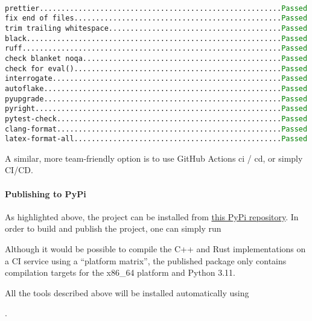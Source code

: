\texttt{
  \hspace*{-1em} prettier........................................................\textcolor{green}{Passed} \\
  fix end of files................................................\textcolor{green}{Passed} \\
  trim trailing whitespace........................................\textcolor{green}{Passed} \\
  black...........................................................\textcolor{green}{Passed} \\
  ruff............................................................\textcolor{green}{Passed} \\
  check blanket noqa..............................................\textcolor{green}{Passed} \\
  check for eval()................................................\textcolor{green}{Passed} \\
  interrogate.....................................................\textcolor{green}{Passed} \\
  autoflake.......................................................\textcolor{green}{Passed} \\
  pyupgrade.......................................................\textcolor{green}{Passed} \\
  pyright.........................................................\textcolor{green}{Passed} \\
  pytest-check....................................................\textcolor{green}{Passed} \\
  clang-format....................................................\textcolor{green}{Passed} \\
  latex-format-all................................................\textcolor{green}{Passed}
}

A similar, more team-friendly option is to use GitHub Actions \gls{ci} / \gls{cd}, or simply CI/CD.

\paragraph{Publishing to PyPi}
As highlighted above, the project can be installed from \href{https://pypi.org/project/melon-scheduler/}{this PyPi repository}.
In order to build and publish the project, one can simply run


Although it would be possible to compile the C++ and Rust implementations on a CI service using a ``platform matrix'', the published package only contains compilation targets for the x86\_64 platform and Python 3.11.

All the tools described above will be installed automatically using

.
